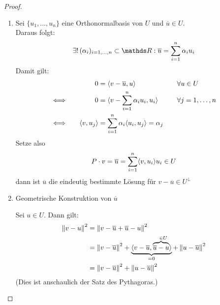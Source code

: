 \begin{proof}~
  \begin{enumerate}[1)]
  \item Sei $\{u_1, \dots , u_n \}$ eine Orthonormalbasis von $U$ 
    und $\overline{u}\in U $. \\
    Daraus folgt:
    \begin{gather*}
      \exists ! \, (\alpha_i)_{i=1,\dotsc,n} \subset \R: \overline{u} = \sum_{i=1}^{n} \alpha_i u_i
    \end{gather*}
    Damit gilt:
    \begin{alignat*}{3}
      &&0 &= \langle v-\overline{u}, u \rangle &\quad& \forall u \in U \\
      &\Longleftrightarrow \quad& 0 &= \langle v- \sum_{i=1}^{n} \alpha_i u_i, u_i \rangle &\quad &\forall j=1, \dots , n\\
      &\Longleftrightarrow  & \langle v, u_j \rangle &= \sum_{i=1}^{n} \alpha_i \langle u_i, u_j \rangle = \alpha_j
    \end{alignat*}
    Setze also 
    \begin{gather}
      P\cdot v = \overline{u}
               = \sum_{i=1}^{n} \langle v, u_i \rangle u_i \in U
                 \label{IV.3.4}
    \end{gather}
    dann ist $\overline{u}$ die eindeutig bestimmte Lösung für $ v-\overline{u} \in U^\bot$
    \item
    \begin{image}{Geometrische Konstruktion von $\overline{u}$}
    \end{image}
Sei  $u\in U$. Dann gilt:
    \begin{align}
      \nonumber
      \left\| v-u \right\|^2 &= \left\| v-\overline{u}+\overline{u} -u \right\|^2 \\ \nonumber
                 &= \left\| v-\overline{u} \right\|^2 +
                   \underbrace{\langle v-\overline{u}, \overbrace{\overline{u}-u}^{~~\in U} \rangle}_{=0}
                   + \left\| u-\overline{u} \right\|^2 \\
                 &= \left\| v-\overline{u} \right\|^2 + \left\| u-\overline{u} \right\|^2
                   \label{IV.3.5}
    \end{align}
    (Dies ist anschaulich der Satz des Pythagoras.)
  \end{enumerate}
\end{proof}


